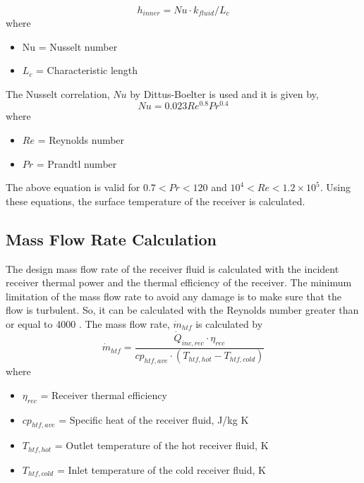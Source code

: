 \begin{equation}
h_{inner}=Nu\cdot k_{fluid}/L_c
\end{equation}
where
\begin{itemize}
	\item Nu = Nusselt number
	\item $L_c$ = Characteristic length 
\end{itemize}
The Nusselt correlation, $Nu$ by Dittus-Boelter \cite{Benoit.2016} is used and it is given by,
\begin{equation}
Nu = 0.023Re^{0.8}Pr^{0.4}
\end{equation}
where
\begin{itemize}
	\item $Re$ = Reynolds number
	\item $Pr$ = Prandtl number
\end{itemize}
\noindent The above equation is valid for $0.7 < Pr < 120$ and $10^4 < Re < 1.2 \times 10^5$. Using these equations, the surface temperature of the receiver is calculated.
\subsection{Mass Flow Rate Calculation}
The design mass flow rate of the receiver fluid is calculated with the incident receiver thermal power and the thermal efficiency of the receiver. The minimum limitation of the mass flow rate to avoid any damage is to make sure that the flow is turbulent. So, it can be calculated with the Reynolds number greater than or equal to 4000 \cite{Rodriguez.2015}. The mass flow rate, $\dot m_{htf}$ is calculated by
\begin{equation}
\dot m_{htf}= \frac{\dot Q_{inc,rec}\cdot \eta_{rec}}{cp_{htf,ave}\cdot (T_{htf,hot}-T_{htf,cold})}
\end{equation}
where 
\begin{itemize}
	\item $\eta_{rec}$ = Receiver thermal efficiency
	\item $cp_{htf,ave}$ = Specific heat of the receiver fluid, J/kg K
	\item $T_{htf,hot}$ = Outlet temperature of the hot receiver fluid, K
	\item $T_{htf,cold}$ = Inlet temperature of the cold receiver fluid, K
\end{itemize}
